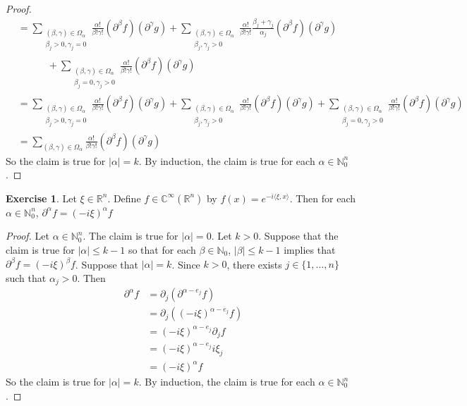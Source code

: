 \documentclass[12pt]{amsart}
\theoremstyle{definition}
\newtheorem{ex}[definition]{Exercise}
\newcommand{\p}{\partial}
\newcommand{\al}{\alpha}
\newcommand{\be}{\beta}
\newcommand{\gam}{\gamma}
\newcommand{\Om}{\Omega}
\newcommand{\C}{\mathbb{C}}
\newcommand{\N}{\mathbb{N}}
\newcommand{\R}{\mathbb{R}}
\renewcommand{\r}{\rangle}
\renewcommand{\l}{\langle}
\begin{document}
\begin{proof}
\begin{align*}
			& = \sum_{\substack{(\be, \gam) \in \Om_{\al} \\ \be_j > 0, \gam_j = 0}} \frac{\al!}{\be !\gam !} (\p^{\be} f) (\p^{\gam}g) 
			+ \sum_{\substack{(\be, \gam) \in \Om_{\al} \\ \be_j, \gam_j > 0}} \frac{\al!}{\be !\gam !} \frac{\be_j + \gam_j}{\al_j}(\p^{\be} f) (\p^{\gam}g) \\
			& \quad \quad \quad + \sum_{\substack{(\be, \gam) \in \Om_{\al} \\ \be_j = 0, \gam_j > 0}} \frac{\al!}{\be !\gam !} (\p^{\be} f) (\p^{\gam}g)\\ 
			& = \sum_{\substack{(\be, \gam) \in \Om_{\al} \\ \be_j > 0, \gam_j = 0}} \frac{\al!}{\be !\gam !} (\p^{\be} f) (\p^{\gam}g) 
			+ \sum_{\substack{(\be, \gam) \in \Om_{\al} \\ \be_j, \gam_j > 0}} \frac{\al!}{\be !\gam !} (\p^{\be} f) (\p^{\gam}g) +  \sum_{\substack{(\be, \gam) \in \Om_{\al} \\ \be_j = 0, \gam_j > 0}} \frac{\al!}{\be !\gam !} (\p^{\be} f) (\p^{\gam}g)\\ 
			& = \sum_{(\be, \gam) \in \Om_{\al}} \frac{\al!}{\be !\gam !} (\p^{\be} f) (\p^{\gam}g) 
		\end{align*}
		So the claim is true for $|\al| = k$. By induction, the claim is true for each $\al \in \N_0^n$.
	\end{proof}

	\begin{ex}
		Let $\xi \in \R^n$. Define $f \in \C^{\infty}(\R^n)$ by $f(x) = e^{-i \l \xi , x \r}$. Then for each $\al \in \N_{0}^n$, $\p^{\al} f = (-i \xi)^{\al} f$
	\end{ex}

	\begin{proof}
		Let $\al \in \N_0^n$. The claim is true for $|\al| = 0$. Let $k > 0$. Suppose that the claim is true for $|\al| \leq k-1$ so that for each $\be \in \N_0$, $|\be| \leq k-1$ implies that $\p^{\be} f = (-i\xi)^{\be} f$. Suppose that $|\al| = k$. Since $k > 0$, there exists $j \in \{1, \ldots, n\}$ such that $\al_j >0$. Then
		\begin{align*}
			\p^{\al} f
			& = \p_j (\p^{\al - e_j} f) \\
			& = \p_j( (-i \xi)^{\al - e_j} f) \\
			& = (-i \xi)^{\al - e_j} \p_j f \\
			& = (-i \xi)^{\al - e_j} i \xi_j \\
			& = (-i \xi)^{\al} f
		\end{align*}  
		So the claim is true for $|\al| = k$. By induction, the claim is true for each $\al \in \N_0^n$.
		
	\end{proof}
	
\end{document}
